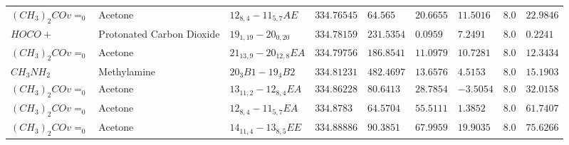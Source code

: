 \documentclass[10pt]{article}
\begin{document}
\begin{landscape}
\begin{table}[htb]
\begin{tabular}{l l l l l l l l l}
$(CH_{3})_{2}COv=_{0}$ & Acetone & $12_{8,4}-11_{5,7}AE$ & $334.76545$ & $64.565$ & $20.6655$ & $11.5016$ & $8.0$ & $22.9846$\\
$HOCO+$ & Protonated Carbon Dioxide & $19_{1,19}-20_{0,20}$ & $334.78159$ & $231.5354$ & $0.0959$ & $7.2491$ & $8.0$ & $0.2241$\\
$(CH_{3})_{2}COv=_{0}$ & Acetone & $21_{13,9}-20_{12,8}EA$ & $334.79756$ & $186.8541$ & $11.0979$ & $10.7281$ & $8.0$ & $12.3434$\\
$CH_{3}NH_{2}$ & Methylamine & $20_{3}B1-19_{4}B2$ & $334.81231$ & $482.4697$ & $13.6576$ & $4.5153$ & $8.0$ & $15.1903$\\
$(CH_{3})_{2}COv=_{0}$ & Acetone & $13_{11,2}-12_{8,4}EA$ & $334.86228$ & $80.6413$ & $28.7854$ & $-3.5054$ & $8.0$ & $32.0158$\\
$(CH_{3})_{2}COv=_{0}$ & Acetone & $12_{8,4}-11_{5,7}EA$ & $334.8783$ & $64.5704$ & $55.5111$ & $1.3852$ & $8.0$ & $61.7407$\\
$(CH_{3})_{2}COv=_{0}$ & Acetone & $14_{11,4}-13_{8,5}EE$ & $334.88886$ & $90.3851$ & $67.9959$ & $19.9035$ & $8.0$ & $75.6266$\\
\hline
    \end{tabular}
\end{table}


\end{landscape}
\end{document}
